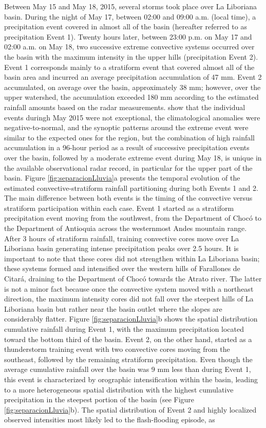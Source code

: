 \documentclass[hess, manuscript]{copernicus}
\begin{document}
Between May 15 and May 18, 2015, several storms took place over La Liboriana basin.  During the night of May 17, between 02:00 and 09:00 a.m. (local time), a precipitation event covered in almost all of the basin (hereafter referred to as precipitation Event 1). Twenty hours later, between 23:00 p.m. on May 17 and 02:00 a.m. on May 18, two successive extreme convective systems occurred over the basin with the maximum intensity in the upper hills (precipitation Event 2). Event 1 corresponds mainly to a stratiform event that covered almost all of the basin area and incurred an average precipitation accumulation of 47 $\text{mm}$. Event 2 accumulated, on average over the basin, approximately 38 $\text{mm}$; however, over the upper watershed, the accumulation exceeded 180 $\text{mm}$ according to the estimated rainfall amounts based on the radar measurements. \citet{Hoyos2019} show that the individual events duringh May 2015 were not exceptional, the climatological anomalies were negative-to-normal, and the synoptic patterns around the extreme event were similar to the expected ones for the region, but the combination of high rainfall accumulation in a 96-hour period as a result of successive precipitation events over the basin, followed by a moderate extreme event during May 18, is unique in the available observational radar record, in particular for the upper part of the basin. Figure \ref{fig:separacionLluvia}a presents the temporal evolution of the estimated convective-stratiform rainfall partitioning during both Events 1 and 2. The main difference between both events is the timing of the convective versus stratiform participation within each case. Event 1 started as a stratiform precipitation event moving from the southwest, from the Department of Chocó to the Department of Antioquia across the westernmost Andes mountain range.  After 3 hours of stratiform rainfall, training convective cores move over La Liboriana basin generating intense precipitation peaks over 2.5 hours. It is important to note that these cores did not strengthen within La Liboriana basin; these systems formed and intensified over the western hills of Farallones de Citará, draining to the Department of Chocó towards the Atrato river. The latter is not a minor fact because once the convective system moved with a northeast direction, the maximum intensity cores did not fall over the steepest hills of La Liboriana basin but rather near the basin outlet where the slopes are considerably flatter. Figure \ref{fig:separacionLluvia}b shows the spatial distribution cumulative rainfall during Event 1, with the maximum precipitation located toward the bottom third of the basin. Event 2, on the other hand, started as a thunderstorm training event with two convective cores moving from the southeast, followed by the remaining stratiform precipitation. Even though the average cumulative rainfall over the basin was 9 mm less than during Event 1, this event is characterized by orographic intensification within the basin, leading to a more heterogeneous spatial distribution with the highest cumulative precipitation in the steepest portion of the basin (see Figure \ref{fig:separacionLluvia}b). The spatial distribution of Event 2 and highly localized observed intensities most likely led to the flash-flooding episode, as 
\end{document}
